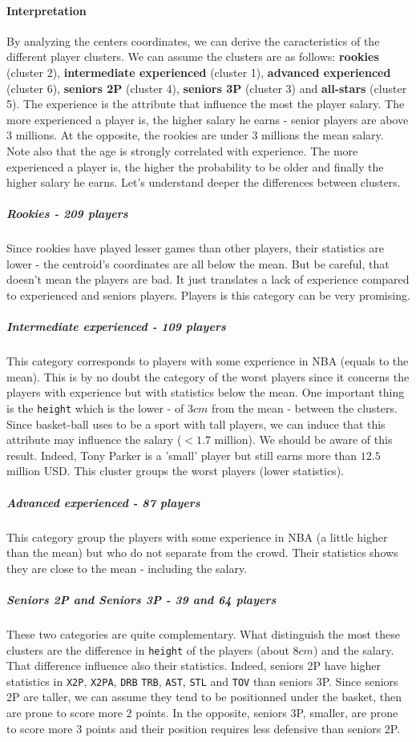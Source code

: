 \paragraph{Interpretation}By analyzing the centers coordinates, we can derive the caracteristics of the different player clusters. We can assume the clusters are as follows: \textbf{rookies} (cluster 2), \textbf{intermediate experienced} (cluster 1), \textbf{advanced experienced} (cluster 6), \textbf{seniors 2P} (cluster 4), \textbf{seniors 3P} (cluster 3) and \textbf{all-stars} (cluster 5). The experience is the attribute that influence the most the player salary. The more experienced a player is, the higher salary he earns - senior players are above $3$ millions. At the opposite, the rookies are under $3$ millions the mean salary. Note also that the age is strongly correlated with experience. The more experienced a player is, the higher the probability to be older and finally the higher salary he earns. Let's understand deeper the differences between clusters.

\subparagraph{Rookies - 209 players}Since rookies have played lesser games than other players, their statistics are lower - the centroid's coordinates are all below the mean. But be careful, that doesn't mean the players are bad. It just translates a lack of experience compared to experienced and seniors players. Players is this category can be very promising.

\subparagraph{Intermediate experienced - 109 players}This category corresponds to players with some experience in NBA (equals to the mean). This is by no doubt the category of the worst players since it concerns the players with experience but with statistics below the mean. One important thing is the \texttt{height} which is the lower - of $3cm$ from the mean - between the clusters. Since basket-ball uses to be a sport with tall players, we can induce that this attribute may influence the salary ($<1.7$ million). We should be aware of this result. Indeed, Tony Parker is a 'small' player but still earns more than $12.5$ million USD. This cluster groups the worst players (lower statistics).

\subparagraph{Advanced experienced - 87 players}This category group the players with some experience in NBA (a little higher than the mean) but who do not separate from the crowd. Their statistics shows they are close to the mean - including the salary.

\subparagraph{Seniors 2P and Seniors 3P - 39 and 64 players}These two categories are quite complementary. What distinguish the most these clusters are the difference in \texttt{height} of the players (about $8cm$) and the salary. That difference influence also their statistics. Indeed, seniors 2P have higher statistics in \texttt{X2P}, \texttt{X2PA}, \texttt{DRB} \texttt{TRB}, \texttt{AST}, \texttt{STL} and \texttt{TOV} than seniors 3P. Since seniors 2P are taller, we can assume they tend to be positionned under the basket, then are prone to score more $2$ points. In the opposite, seniors 3P, smaller, are prone to score more $3$ points and their position requires less defensive than seniors 2P.

